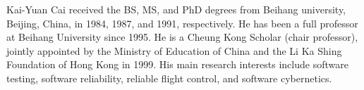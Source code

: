 \documentclass[10pt,journal,compsoc]{IEEEtran}
\begin{document}
\begin{IEEEbiography}{Kai-Yuan Cai} received the BS, MS, and PhD degrees from Beihang university, Beijing, China, in 1984, 1987, and 1991, respectively. He has been a full professor at Beihang University since 1995. He is a Cheung Kong Scholar (chair professor), jointly appointed by the Ministry of Education of China and the Li Ka Shing Foundation of Hong Kong in 1999. His main research interests include software testing, software reliability, reliable flight control, and software cybernetics.
\end{IEEEbiography}
\end{document}
